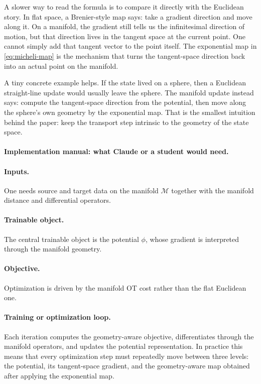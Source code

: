 \documentclass[11pt]{report}
\begin{document}
A slower way to read the formula is to compare it directly with the Euclidean story.
In flat space, a Brenier-style map says: take a gradient direction and move along it.
On a manifold, the gradient still tells us the infinitesimal direction of motion, but
that direction lives in the tangent space at the current point.  One cannot simply add
that tangent vector to the point itself.  The exponential map in
\eqref{eq:micheli-map} is the mechanism that turns the tangent-space direction back
into an actual point on the manifold.

A tiny concrete example helps.  If the state lived on a sphere, then a Euclidean
straight-line update would usually leave the sphere.  The manifold update instead says:
compute the tangent-space direction from the potential, then move along the sphere's
own geometry by the exponential map.  That is the smallest intuition behind the paper:
keep the transport step intrinsic to the geometry of the state space.

\paragraph{Implementation manual: what Claude or a student would need.}
\paragraph{Inputs.}
One needs source and target data on the manifold $\mathcal M$ together with the
manifold distance and differential operators.

\paragraph{Trainable object.}
The central trainable object is the potential $\phi$, whose gradient is interpreted
through the manifold geometry.

\paragraph{Objective.}
Optimization is driven by the manifold OT cost rather than the flat Euclidean one.

\paragraph{Training or optimization loop.}
Each iteration computes the geometry-aware objective, differentiates through the
manifold operators, and updates the potential representation.  In practice this means
that every optimization step must repeatedly move between three levels: the potential,
its tangent-space gradient, and the geometry-aware map obtained after applying the
exponential map.
\end{document}

